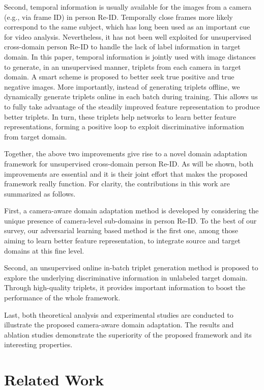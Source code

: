 \documentclass[10pt,twocolumn,letterpaper]{article}
\begin{document}
Second, temporal information is usually available for the images from a camera (e.g., via frame ID) in person Re-ID. Temporally close frames more likely correspond to the same subject, which has long been used as an important cue for video analysis. Nevertheless, it has not been well exploited for unsupervised cross-domain person Re-ID to handle the lack of label information in target domain. In this paper, temporal information is jointly used with image distances to generate, in an unsupervised manner, triplets from each camera in target domain. A smart scheme is proposed to better seek true positive and true negative images. More importantly, instead of generating triplets offline, we dynamically generate triplets online in each batch during training. This allows us to fully take advantage of the steadily improved feature representation to produce better triplets. In turn, these triplets help networks to learn better feature representations, forming a positive loop to exploit discriminative information from target domain. 


Together, the above two improvements give rise to a novel domain adaptation framework for unsupervised cross-domain person Re-ID. As will be shown, both improvements are essential and it is their joint effort that makes the proposed framework really function. For clarity, the contributions in this work are summarized as follows. 
 
First, a camera-aware domain adaptation method is developed by considering the unique presence of camera-level sub-domains in person Re-ID. 
To the best of our survey, our adversarial learning based method is the first one, among those aiming to learn better feature representation, to integrate source and target domains at this fine level.
 
Second, an unsupervised online in-batch triplet generation method is proposed to explore the underlying discriminative information in unlabeled target domain. Through high-quality triplets, it provides important information to boost the performance of the whole framework.  
 
Last, both theoretical analysis and experimental studies are conducted to illustrate the proposed camera-aware domain adaptation. The results and ablation studies demonstrate the superiority of the proposed framework and its interesting properties.


 
 
\section{Related Work}
\end{document}
